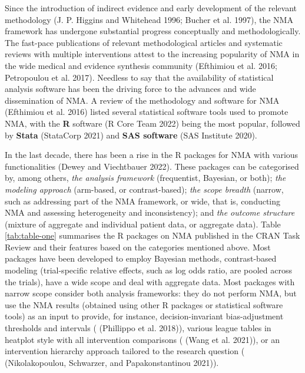 Since the introduction of indirect evidence and early development of the relevant
methodology (J. P. Higgins and Whitehead 1996; Bucher et al. 1997), the NMA framework has undergone substantial
progress conceptually and methodologically. The fast-pace publications of relevant
methodological articles and systematic reviews with multiple interventions attest
to the increasing popularity of NMA in the wide medical and evidence synthesis
community (Efthimiou et al. 2016; Petropoulou et al. 2017). Needless to say that the availability
of statistical analysis software has been the driving force to the advances and
wide dissemination of NMA. A review of the methodology and software for NMA
(Efthimiou et al. 2016) listed several statistical software tools used to promote NMA, with
the \textbf{R} software (R Core Team 2022) being the most popular, followed by \textbf{Stata} (StataCorp 2021)
and \textbf{SAS software} (SAS Institute 2020).

In the last decade, there has been a rise in the R packages for NMA with various
functionalities (Dewey and Viechtbauer 2022). These packages can be categorised by, among
others, \emph{the analysis framework} (frequentist, Bayesian, or both);
\emph{the modeling approach} (arm-based, or contrast-based); \emph{the scope breadth}
(narrow, such as addressing part of the NMA framework, or wide, that is, conducting
NMA and assessing heterogeneity and inconsistency); and \emph{the outcome structure}
(mixture of aggregate and individual patient data, or aggregate data). Table
\ref{tab:table-one} summarises the R packages on NMA published in the CRAN Task Review and their features
based on the categories mentioned above. Most packages have been developed to employ
Bayesian methods, contrast-based modeling (trial-specific relative effects, such
as log odds ratio, are pooled across the trials), have a wide scope and deal with
aggregate data. Most packages with narrow scope consider both analysis frameworks:
they do not perform NMA, but use the NMA results (obtained using other R packages
or statistical software tools) as an input to provide, for instance, decision-invariant
bias-adjustment thresholds and intervals ( (Phillippo et al. 2018)),
various league tables in heatplot style with all intervention comparisons
( (Wang et al. 2021)), or an intervention hierarchy approach
tailored to the research question ( (Nikolakopoulou, Schwarzer, and Papakonstantinou 2021)).

